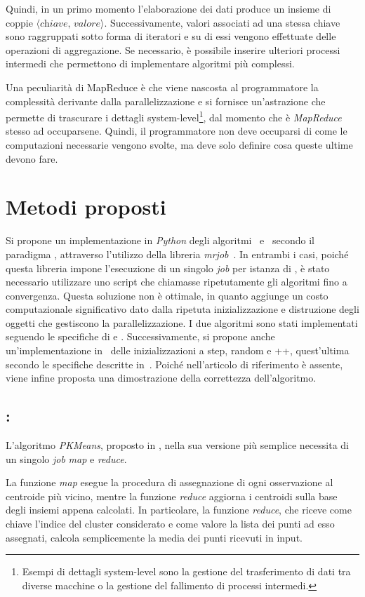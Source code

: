 \documentclass[runningheads]{llncs}
\begin{document}
Quindi, in un primo momento l'elaborazione dei dati produce un insieme di coppie $\langle \textit{chiave, valore} \rangle $.
Successivamente, valori associati ad una stessa chiave sono raggruppati sotto forma di iteratori e su di essi vengono effettuate delle operazioni di aggregazione.
Se necessario, è possibile inserire ulteriori processi intermedi che permettono di implementare algoritmi più complessi.

Una peculiarità di MapReduce è che viene nascosta al programmatore la complessità derivante dalla parallelizzazione e si fornisce un'astrazione che permette di trascurare i dettagli system-level\footnote{Esempi di dettagli system-level sono la gestione del trasferimento di dati tra diverse macchine o la gestione del fallimento di processi intermedi.}, dal momento che è \emph{MapReduce} stesso ad occuparsene.
Quindi, il programmatore non deve occuparsi di come le computazioni necessarie vengono svolte, ma deve solo definire cosa queste ultime devono fare.

\section{Metodi proposti}
Si propone un implementazione in \textit{Python} degli algoritmi \km\ e \fcm\ secondo il paradigma \mr, attraverso l'utilizzo della libreria \textit{mrjob}~\cite{marin2020}. In entrambi i casi, poiché questa libreria impone l'esecuzione di un singolo \textit{job} per istanza di \mr, è stato necessario utilizzare uno script che chiamasse ripetutamente gli algoritmi fino a convergenza. Questa soluzione non è ottimale, in quanto aggiunge un costo computazionale significativo dato dalla ripetuta inizializzazione e distruzione degli oggetti che gestiscono la parallelizzazione.
I due algoritmi sono stati implementati seguendo le specifiche di \cite{zhao2009} e \cite{ludwig2015}. Successivamente, si propone anche un'implementazione in \mr\ delle inizializzazioni a step, random e ++, quest'ultima secondo le specifiche descritte in~\cite{bodoia}. Poiché nell'articolo di riferimento è assente, viene infine proposta una dimostrazione della correttezza dell'algoritmo.
\subsection*{\mr: \km}
L'algoritmo \emph{PKMeans}, proposto in \cite{zhao2009}, nella sua versione più semplice necessita di un singolo \textit{job} \textit{map} e \textit{reduce}.

La funzione \emph{map} esegue la procedura di assegnazione di ogni osservazione al centroide più vicino, mentre la funzione \emph{reduce} aggiorna i centroidi sulla base degli insiemi appena calcolati. In particolare, la funzione \emph{reduce}, che riceve come chiave l'indice del cluster considerato e come valore la lista dei punti ad esso assegnati, calcola semplicemente la media dei punti ricevuti in input. 
\end{document}
